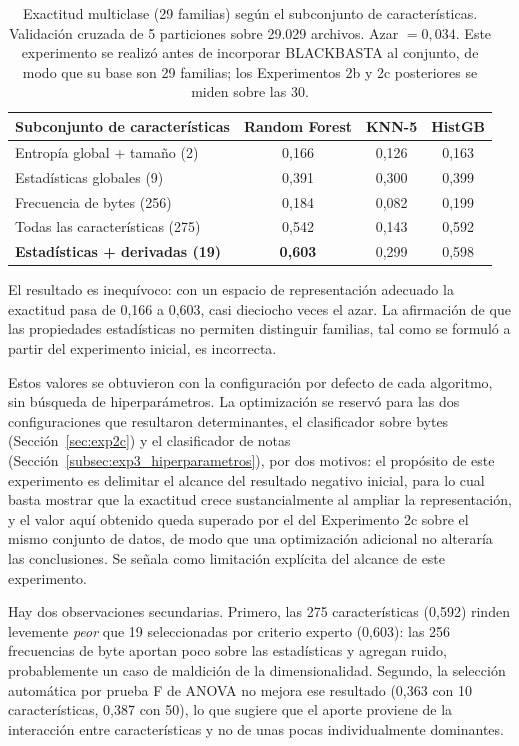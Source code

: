 \begin{table}[ht]
\centering
\caption{Exactitud multiclase (29 familias) según el subconjunto de características. Validación cruzada de 5 particiones sobre 29.029 archivos. Azar $= 0{,}034$. Este experimento se realizó antes de incorporar BLACKBASTA al conjunto, de modo que su base son 29 familias; los Experimentos 2b y 2c posteriores se miden sobre las 30.}
\label{tab:exp2_ampliado}
\begin{tabular}{|l|c|c|c|}
\hline
\textbf{Subconjunto de características} & \textbf{Random Forest} & \textbf{KNN-5} & \textbf{HistGB} \\
\hline
Entropía global + tamaño (2) & 0,166 & 0,126 & 0,163 \\
Estadísticas globales (9) & 0,391 & 0,300 & 0,399 \\
Frecuencia de bytes (256) & 0,184 & 0,082 & 0,199 \\
Todas las características (275) & 0,542 & 0,143 & 0,592 \\
\textbf{Estadísticas + derivadas (19)} & \textbf{0,603} & 0,299 & 0,598 \\
\hline
\end{tabular}
\end{table}

El resultado es inequívoco: con un espacio de representación adecuado la exactitud pasa de 0,166 a 0,603, casi dieciocho veces el azar. La afirmación de que las propiedades estadísticas no permiten distinguir familias, tal como se formuló a partir del experimento inicial, es incorrecta.

Estos valores se obtuvieron con la configuración por defecto de cada algoritmo, sin búsqueda de hiperparámetros. La optimización se reservó para las dos configuraciones que resultaron determinantes, el clasificador sobre bytes (Sección~\ref{sec:exp2c}) y el clasificador de notas (Sección~\ref{subsec:exp3_hiperparametros}), por dos motivos: el propósito de este experimento es delimitar el alcance del resultado negativo inicial, para lo cual basta mostrar que la exactitud crece sustancialmente al ampliar la representación, y el valor aquí obtenido queda superado por el del Experimento 2c sobre el mismo conjunto de datos, de modo que una optimización adicional no alteraría las conclusiones. Se señala como limitación explícita del alcance de este experimento.

Hay dos observaciones secundarias. Primero, las 275 características (0,592) rinden levemente \textit{peor} que 19 seleccionadas por criterio experto (0,603): las 256 frecuencias de byte aportan poco sobre las estadísticas y agregan ruido, probablemente un caso de maldición de la dimensionalidad. Segundo, la selección automática por prueba F de ANOVA no mejora ese resultado (0,363 con 10 características, 0,387 con 50), lo que sugiere que el aporte proviene de la interacción entre características y no de unas pocas individualmente dominantes.


